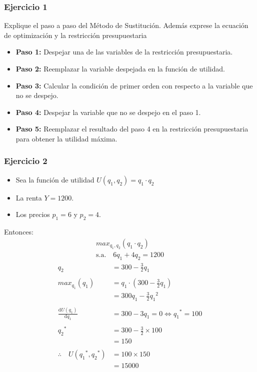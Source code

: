\documentclass{templateNote}
\begin{document}
\subsubsection{Ejercicio 1}
\indent
Explique el paso a paso del Método de Sustitución. Además exprese la ecuación de
optimización y la restricción presupuestaria
\begin{itemize}
    \item \textbf{Paso 1:} Despejar una de las variables de la restricción presupuestaria.
    \item \textbf{Paso 2:} Reemplazar la variable despejada en la función de utilidad.
    \item \textbf{Paso 3:} Calcular la condición de primer orden con respecto a la variable que no se despejo.
    \item \textbf{Paso 4:} Despejar la variable que no se despejo en el paso 1.
    \item \textbf{Paso 5:} Reemplazar el resultado del paso 4 en la restricción presupuestaria para obtener la utilidad máxima.
\end{itemize}

\subsubsection{Ejercicio 2}
\begin{itemize}
    \item Sea la función de utilidad $U(q_1,q_2) = q_1 \cdot q_2$
    \item La renta $Y = 1200$.
    \item Los precios $p_1 = 6$ y $p_2 = 4$.
\end{itemize}

Entonces:
\begin{equation*}
    \begin{split}
        max_{q_1, q_2} (q_1 \cdot q_2) \\
        \text{s.a.} \quad 6q_1 + 4q_2 = 1200
    \end{split}
\end{equation*}
\begin{align*}
    q_2 &= 300 - \frac{3}{2}q_1 \\
    \\
    max_{q_1} (q_1) &= q_1 \cdot (300 - \frac{3}{2}q_1) \\
    &= 300q_1 - \frac{3}{2} {q_1}^2 \\
    \\
    \frac{\mathrm{d} U(q_1)}{\mathrm{d}q_1} &= 300 - 3q_1 = 0 \Leftrightarrow {q_1}^* = 100 \\
    \\
    {q_2}^* &= 300 - \frac{3}{2} \times 100 \\
    &= 150 \\
    \\
    \therefore \quad U({q_1}^*, {q_2}^*) &= 100 \times 150 \\
    &= 15000
\end{align*}
\end{document}
